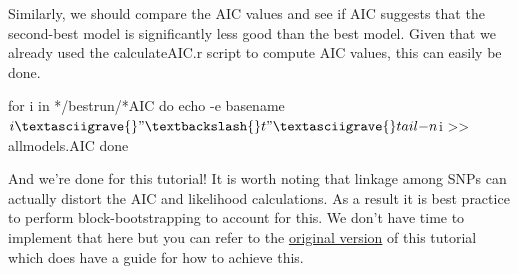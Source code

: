 \documentclass[
  letterpaper,
  DIV=11,
  numbers=noendperiod]{scrartcl}
\newenvironment{Shaded}{\begin{snugshade}}{\end{snugshade}}
\newcommand{\NormalTok}[1]{\textcolor[rgb]{0.00,0.23,0.31}{#1}}
\begin{document}
Similarly, we should compare the AIC values and see if AIC suggests that
the second-best model is significantly less good than the best model.
Given that we already used the calculateAIC.r script to compute AIC
values, this can easily be done.

\begin{Shaded}
\begin{Highlighting}[]
\NormalTok{for i in */bestrun/*AIC}
\NormalTok{do}
\NormalTok{echo {-}e \textasciigrave{}basename $i\textasciigrave{}"\textbackslash{}t"\textasciigrave{}tail {-}n $i\textasciigrave{} \textgreater{}\textgreater{} allmodels.AIC}
\NormalTok{done}
\end{Highlighting}
\end{Shaded}

And we're done for this tutorial! It is worth noting that linkage among
SNPs can actually distort the AIC and likelihood calculations. As a
result it is best practice to perform block-bootstrapping to account for
this. We don't have time to implement that here but you can refer to the
\href{https://speciationgenomics.github.io/fastsimcoal2/}{original
version} of this tutorial which does have a guide for how to achieve
this.
\end{document}
